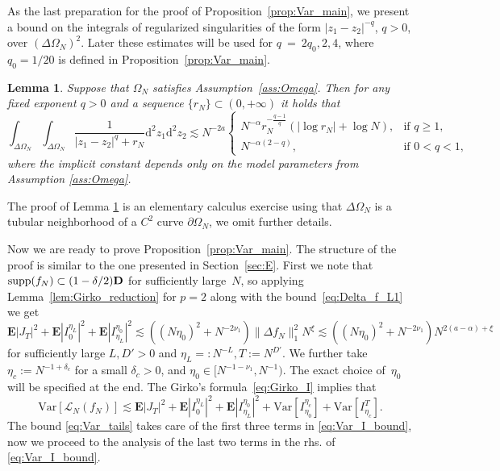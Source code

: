 \documentclass[10pt]{amsart}
\newtheorem{lemma}[theorem]{Lemma}
\numberwithin{equation}{section}
\newcommand{\dif}{\mathrm{d}}
\newcommand{\E}{\mathbf{E}}
\newcommand{\Var}{\mathrm{Var}}
\newcommand{\Lin}{\mathcal{L}}
\begin{document}
As the last preparation for the proof of Proposition~\ref{prop:Var_main}, we present a bound on the integrals of regularized singularities of the form $|z_1-z_2|^{-q}$, $q> 0$, over $(\Delta\Omega_N)^2$. Later these estimates will be used for $q~\!=~\!2q_0,2,4$, where $q_0=1/20$ is defined in Proposition~\ref{prop:Var_main}. 
\begin{lemma}\label{lem:int} Suppose that $\Omega_N$ satisfies Assumption~\ref{ass:Omega}. Then for any fixed exponent $q>0$ and a sequence $\{r_N\}\subset (0,+\infty)$ it holds that 
\begin{equation}
\int_{\Delta\Omega_N}\int_{\Delta\Omega_N} \frac{1}{|z_1-z_2|^q + r_N}\dif^2 z_1\dif^2 z_2 \lesssim N^{-2a}\begin{cases}
N^{-\alpha}r_N^{-\frac{q-1}{q}} \left(|\log r_N|+\log N\right),&\text{if}\,\, q\ge 1,\\
N^{-\alpha(2-q)},&\text{if}\,\, 0<q< 1,
\end{cases}
\label{eq:int}
\end{equation}
where the implicit constant depends only on the model parameters from Assumption \ref{ass:Omega}.
\end{lemma}

The proof of Lemma \ref{lem:int} is an elementary calculus exercise using that $\Delta \Omega_N$ is a tubular neighborhood of a $C^2$ curve $\partial\Omega_N$, we omit further details.

Now we are ready to prove Proposition~\ref{prop:Var_main}. The structure of the proof is similar to the one presented  in Section~\ref{sec:E}. First we note that ${\rm supp}(f_N)\subset (1-\delta/2)\mathbf{D}$ for sufficiently large~$N$, so applying Lemma~\ref{lem:Girko_reduction} for $p=2$ along with the bound~\eqref{eq:Delta_f_L1} we get
\begin{equation}
\E |J_T|^2 + \E |I_0^{\eta_L}|^2 + \E |I_{\eta_L}^{\eta_0}|^2 \lesssim \left((N\eta_0)^2+N^{-2\nu_1}\right) \|\Delta f_N\|_1^2 N^\xi\lesssim \left((N\eta_0)^2+N^{-2\nu_1}\right) N^{2(a-\alpha)+\xi}
\label{eq:Var_tails}
\end{equation}
for sufficiently large $L,D'>0$ and $\eta_L=:N^{-L}, T:=N^{D'}$. We further take $\eta_c:=N^{-1+\delta_c}$ for a small $\delta_c>0$, and $\eta_0\in [N^{-1-\nu_1},N^{-1})$. The exact choice of~$\eta_0$ will be specified at the end. The Girko's formula~\eqref{eq:Girko_I} implies that
\begin{equation}
\Var\left[\Lin_N(f_N)\right] \lesssim \E|J_T|^2 + \E|I_0^{\eta_L}|^2 + \E|I_{\eta_L}^{\eta_0}|^2+\Var\left[I_{\eta_0}^{\eta_c}\right]+\Var\left[I_{\eta_c}^T\right].
\label{eq:Var_I_bound}
\end{equation}
The bound \eqref{eq:Var_tails} takes care of the first three terms in \eqref{eq:Var_I_bound}, now we proceed to the analysis of the last two terms in the rhs. of \eqref{eq:Var_I_bound}.
\end{document}
